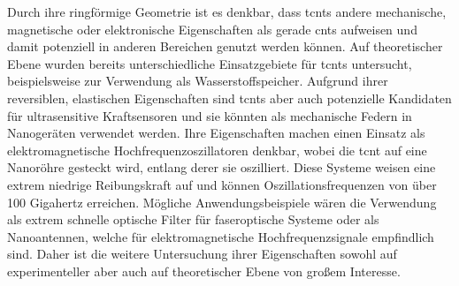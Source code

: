 Durch ihre ringförmige Geometrie ist es denkbar, dass \acp{tcnt} andere mechanische, magnetische oder elektronische Eigenschaften als gerade \acp{cnt} aufweisen und damit potenziell in anderen Bereichen genutzt werden können.\supercite{liu2014curved} Auf theoretischer Ebene wurden bereits unterschiedliche Einsatzgebiete für \acp{tcnt} untersucht, beispielsweise zur Verwendung als Wasserstoffspeicher\supercite{castillo2010hydrogen,cruz2010hydrogen}. Aufgrund ihrer reversiblen, elastischen Eigenschaften sind \acp{tcnt} aber auch potenzielle Kandidaten für ultrasensitive Kraftsensoren und sie könnten als mechanische Federn in Nanogeräten verwendet werden.\supercite{zheng2010elastic,chen2011controlling} Ihre Eigenschaften machen einen Einsatz als elektromagnetische Hochfrequenzoszillatoren denkbar, wobei die \ac{tcnt} auf eine Nanoröhre gesteckt wird, entlang derer sie oszilliert. \supercite{hilder2007oscillating,ansari2017oscillation} Diese Systeme weisen eine extrem niedrige Reibungskraft\supercite{cumings2000low} auf und können Oszillationsfrequenzen von über 100 Gigahertz erreichen.\supercite{liu2014curved} Mögliche Anwendungsbeispiele wären die Verwendung als extrem schnelle optische Filter für faseroptische Systeme oder als Nanoantennen, welche für elektromagnetische Hochfrequenzsignale empfindlich sind.\supercite{hilder2007oscillating} Daher ist die weitere Untersuchung ihrer Eigenschaften sowohl auf experimenteller aber auch auf theoretischer Ebene von großem Interesse.

